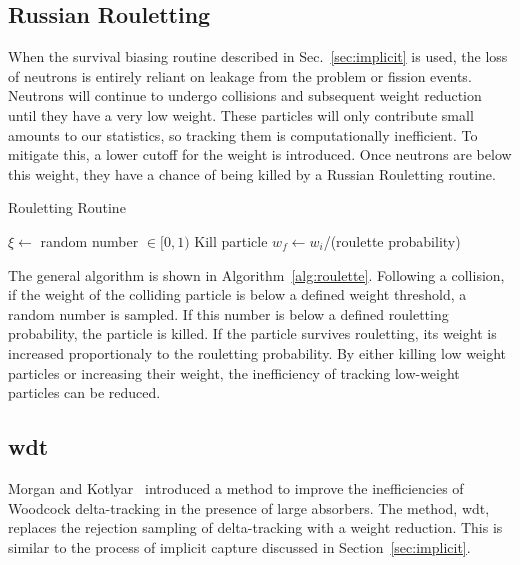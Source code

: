 \subsection{Russian Rouletting}
\label{sec:rouletting}

When the survival biasing routine described in Sec.~\ref{sec:implicit}
is used, the loss of neutrons is entirely reliant on leakage from the
problem or fission events. Neutrons will continue to undergo
collisions and subsequent weight reduction until they have a very low
weight. These particles will only contribute small amounts to our
statistics, so tracking them is computationally inefficient.  To
mitigate this, a lower cutoff for the weight is introduced. Once
neutrons are below this weight, they have a chance of being killed by
a Russian Rouletting routine. 
\begin{algorithm}
\caption{Rouletting Routine}\label{alg:roulette}
\begin{algorithmic}[1]
   \State $\xi \gets $ random number $\in [0,1)$
     \State Kill particle
   \Else
     \State $w_f \gets w_i$/(roulette probability) \label{inc}
   \EndIf
\EndIf
\end{algorithmic}
\end{algorithm}

The general algorithm is shown in
Algorithm~\ref{alg:roulette}. Following a collision, if the weight of the colliding particle is
below a defined weight threshold, a random number is sampled. If this
number is below a defined rouletting probability, the particle is
killed. If the particle survives rouletting, its weight is increased
proportionaly to the rouletting probability. By either killing low weight
particles or increasing their weight, the inefficiency of tracking
low-weight particles can be reduced.

\subsection{\Acrlong{wdt}}
\label{sec:wdttheory}

Morgan and Kotlyar~\cite{morgan2015} introduced a method to improve
the inefficiencies of Woodcock delta-tracking in the presence of large
absorbers. The method, \gls{wdt}, replaces the rejection sampling of
delta-tracking with a weight reduction. This is similar to the process
of implicit capture discussed in Section~\ref{sec:implicit}.

